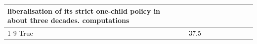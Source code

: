 \begin{table}[H]
\begin{tabular}{lllrlllll}
liberalisation of its strict one-child policy in about three decades. computations \\
\cline{1-9}
True & 37.5%
\end{tabular}
\end{table}
